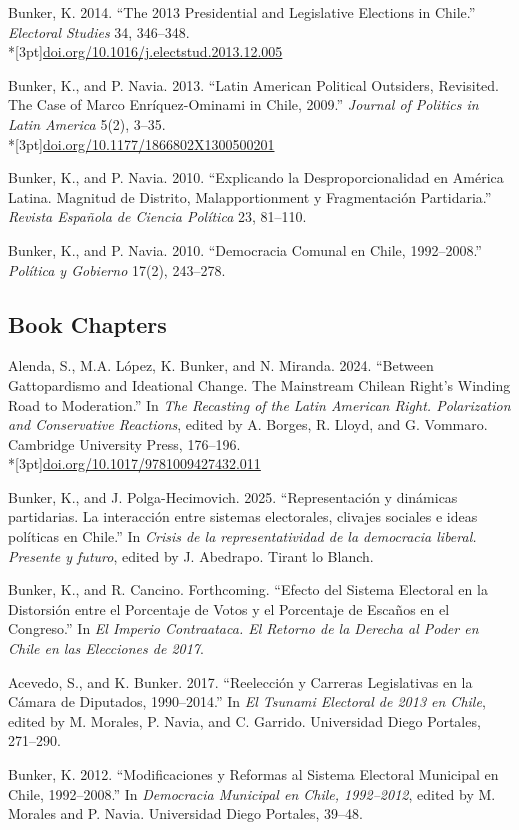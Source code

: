 \documentclass[11pt,letterpaper]{article}
\newif\ifafterhead
\newlength{\entrygap}\setlength{\entrygap}{8.5pt}
\newcommand{\gap}{\ifafterhead\global\afterheadfalse\else\vspace{\entrygap}\fi}
\newcommand{\entry}[1]{\par\gap\hangindent=13pt\hangafter=1\noindent #1\par}
\newcommand{\doi}[1]{\\*[3pt]{\small\href{https://doi.org/#1}{doi.org/#1}}}
\begin{document}
\entry{Bunker, K. 2014. ``The 2013 Presidential and Legislative Elections in Chile.'' \textit{Electoral Studies} 34, 346--348.\doi{10.1016/j.electstud.2013.12.005}}

\entry{Bunker, K., and P. Navia. 2013. ``Latin American Political Outsiders, Revisited. The Case of Marco Enríquez-Ominami in Chile, 2009.'' \textit{Journal of Politics in Latin America} 5(2), 3--35.\doi{10.1177/1866802X1300500201}}

\entry{Bunker, K., and P. Navia. 2010. ``Explicando la Desproporcionalidad en América Latina. Magnitud de Distrito, Malapportionment y Fragmentación Partidaria.'' \textit{Revista Española de Ciencia Política} 23, 81--110.}

\entry{Bunker, K., and P. Navia. 2010. ``Democracia Comunal en Chile, 1992--2008.'' \textit{Política y Gobierno} 17(2), 243--278.}

\subsection{Book Chapters}
\entry{Alenda, S., M.A. López, K. Bunker, and N. Miranda. 2024. ``Between Gattopardismo and Ideational Change. The Mainstream Chilean Right's Winding Road to Moderation.'' In \textit{The Recasting of the Latin American Right. Polarization and Conservative Reactions}, edited by A. Borges, R. Lloyd, and G. Vommaro. Cambridge University Press, 176--196.\doi{10.1017/9781009427432.011}}

\entry{Bunker, K., and J. Polga-Hecimovich. 2025. ``Representación y dinámicas partidarias. La interacción entre sistemas electorales, clivajes sociales e ideas políticas en Chile.'' In \textit{Crisis de la representatividad de la democracia liberal. Presente y futuro}, edited by J. Abedrapo. Tirant lo Blanch.}

\entry{Bunker, K., and R. Cancino. Forthcoming. ``Efecto del Sistema Electoral en la Distorsión entre el Porcentaje de Votos y el Porcentaje de Escaños en el Congreso.'' In \textit{El Imperio Contraataca. El Retorno de la Derecha al Poder en Chile en las Elecciones de 2017}.}

\entry{Acevedo, S., and K. Bunker. 2017. ``Reelección y Carreras Legislativas en la Cámara de Diputados, 1990--2014.'' In \textit{El Tsunami Electoral de 2013 en Chile}, edited by M. Morales, P. Navia, and C. Garrido. Universidad Diego Portales, 271--290.}

\entry{Bunker, K. 2012. ``Modificaciones y Reformas al Sistema Electoral Municipal en Chile, 1992--2008.'' In \textit{Democracia Municipal en Chile, 1992--2012}, edited by M. Morales and P. Navia. Universidad Diego Portales, 39--48.}
\end{document}
